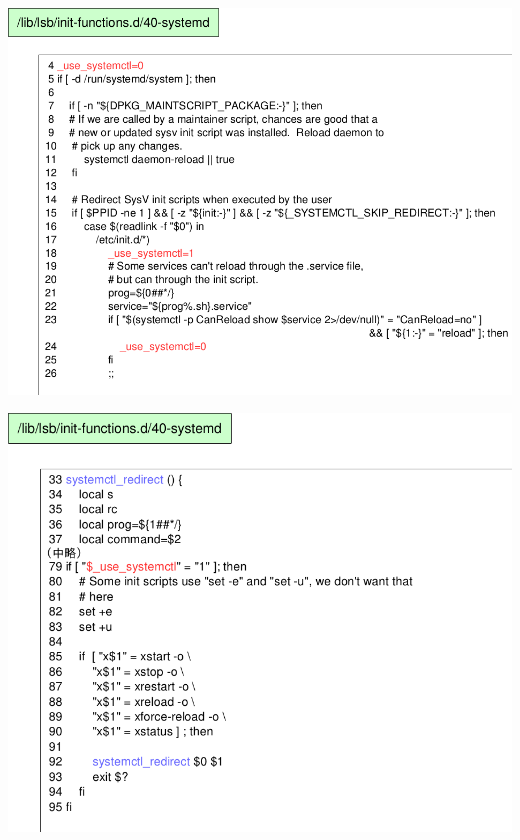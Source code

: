 \begin{frame}
\begin{center}
\includegraphics[width=1\hsize]{image201510/daemonscript2.png}
\end{center}
\end{frame}

\begin{frame}
\begin{center}
\includegraphics[width=1\hsize]{image201510/daemonscript3.png}
\end{center}
\end{frame}


